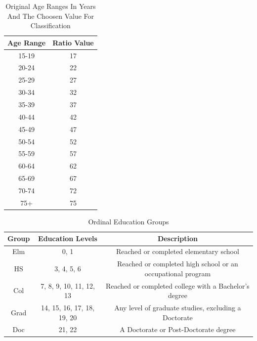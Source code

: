 \documentclass{article}
\begin{document}
    \begin{center}
        \begin{table}
            \centering
            \begin{tabular}{ |c|c| }
                \hline
                Age Range & Ratio Value \\
                \hline
                15-19 & 17 \\
                20-24 & 22 \\
                25-29 & 27 \\
                30-34 & 32 \\
                35-39 & 37 \\
                40-44 & 42 \\
                45-49 & 47 \\
                50-54 & 52 \\
                55-59 & 57 \\
                60-64 & 62 \\
                65-69 & 67 \\
                70-74 & 72 \\
                75+ & 75 \\
                \hline
            \end{tabular}
            \caption{Original Age Ranges In Years And The Choosen Value For Classification}
            \label{tab:3}
        \end{table}
    \end{center}

    \begin{center}
        \begin{table}
            \centering
            \begin{tabular}{ |c|c|c| }
                \hline
                Group & Education Levels & Description \\
                \hline
                Elm & 0, 1 & Reached or completed elementary school \\
                HS & 3, 4, 5, 6 & Reached or completed high school or an occupational program \\
                Col & 7, 8, 9, 10, 11, 12, 13 & Reached or completed college with a Bachelor's degree \\
                Grad & 14, 15, 16, 17, 18, 19, 20 & Any level of graduate studies, excluding a Doctorate \\
                Doc & 21, 22 & A Doctorate or Post-Doctorate degree \\
                \hline
            \end{tabular}
            \caption{Ordinal Education Groups}
            \label{tab:9}
        \end{table}
    \end{center}
\end{document}

